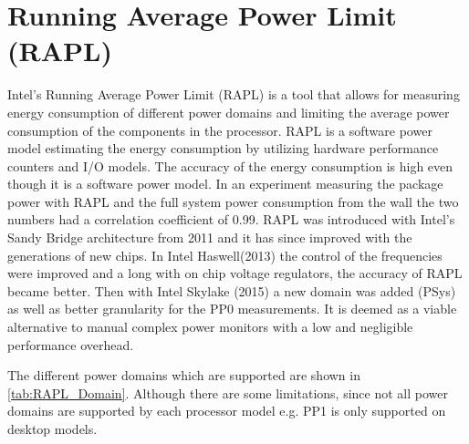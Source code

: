 \section{Running Average Power Limit (RAPL)}
Intel's Running Average Power Limit (RAPL) is a tool that allows for measuring energy consumption of different power domains and limiting the average power consumption of the components in the processor. RAPL is a software power model estimating the energy consumption by utilizing hardware performance counters and I/O models.\cite{Power-Management_Sandy_Bridge} The accuracy of the energy consumption is  high even though it is a software power model\cite{RAPL_ACU1,RAPL_ACU2}. In an experiment measuring the package power with RAPL and the full system power consumption from the wall the two numbers had a correlation coefficient of 0.99.\cite{RAPL_in_action} RAPL was introduced with Intel's Sandy Bridge architecture from 2011 and it has since improved with the generations of new chips. In Intel Haswell(2013) the control of the frequencies were improved and a long with on chip voltage regulators, the accuracy of RAPL became better. Then with Intel Skylake (2015) a new domain was added (PSys) as well as better granularity for the PP0 measurements. It is deemed as   a viable alternative to manual complex power monitors with a low and negligible performance overhead. \cite{RAPL_in_action}

The different power domains which are supported are shown in \cref{tab:RAPL_Domain}. Although there are some limitations, since not all power domains are supported by each processor model e.g. PP1 is only supported on desktop models.

